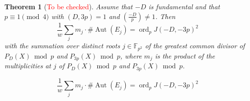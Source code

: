 \documentclass[10pt,a4paper]{amsart}
\newtheorem{thm}{Theorem}
\newcommand{\Aut}{{\operatorname{Aut}}}
\newcommand{\F}{\mathbb{F}}
\newcommand{\ord}{{\operatorname{ord}}}
\begin{document}
\begin{thm}[\textcolor{red}{To be checked}]\label{thm:GZ_for_3p}
Assume  that $-D$ is fundamental
and that $p \equiv 1 \pmod 4$ with $(D,3p) = 1$ and $\left(\frac{-D}{p}\right)\ne 1$. 
Then  
\begin{equation}\label{eq:GZ_for_3p}
\frac{1}{w}
\sum_{j}
m_j\cdot \#\Aut(E_j)=    \ord_p J(-D, -3p)^2
\end{equation}
with the summation over distinct roots $j\in\F_{p^2}$ of the greatest common divisor of $P_D(X) \bmod p$ and $P_{3p}(X) \bmod p$, where $m_j$ is the product of the multiplicities at $j$ of $P_D(X) \bmod p$ and $P_{3p}(X) \bmod p$.
\end{thm}

\begin{equation}
\frac{1}{w}
\sum_{j}
m_j\cdot \#\Aut(E_j)=    \ord_p J(-D, -3p)^2
\end{equation}
\end{document}
